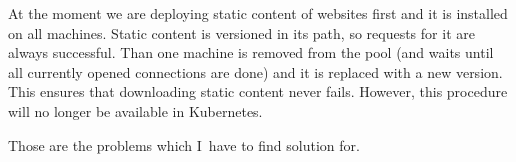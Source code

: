 At the moment we are deploying static content of websites first and it is installed on all machines. Static content is versioned in its path, so requests for it are always successful. Than one machine is removed from the pool (and waits until all currently opened connections are done) and it is replaced with a new version. This ensures that downloading static content never fails. However, this procedure will no longer be available in Kubernetes.

\begin{flushleft}
Those are the problems which I~have to find solution for.
\end{flushleft} 
